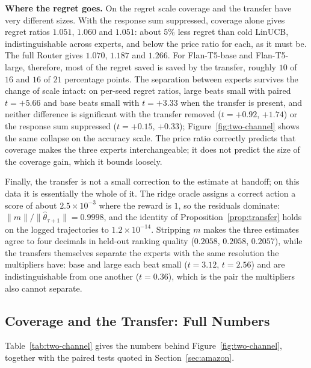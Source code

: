 \documentclass{article}
\theoremstyle{definition}
\theoremstyle{remark}
\theoremstyle{remark}
\begin{document}
\textbf{Where the regret goes.} On the regret scale coverage and the transfer
have very different sizes. With the response sum suppressed, coverage alone gives
regret ratios $1.051$, $1.060$ and $1.051$: about $5\%$ less regret than cold
LinUCB, indistinguishable across experts, and below the price ratio for each,
as it must be. The full Router gives $1.070$, $1.187$ and $1.266$. For
Flan-T5-base and Flan-T5-large, therefore, most of the regret saved is saved
by the transfer, roughly $10$ of $16$ and $16$ of $21$ percentage points. The
separation between experts survives the change of scale intact: on per-seed
regret ratios, large beats small with paired $t=+5.66$ and base beats small
with $t=+3.33$ when the transfer is present, and neither difference is
significant with the transfer removed ($t=+0.92$, $+1.74$) or the response sum
suppressed ($t=+0.15$, $+0.33$); Figure~\ref{fig:two-channel} shows the same
collapse on the accuracy scale. The price ratio correctly predicts that
coverage makes the three experts interchangeable; it does not predict the size
of the coverage gain, which it bounds loosely.

Finally, the transfer is not a small correction to the estimate at handoff; on
this data it is essentially the whole of it. The ridge oracle assigns a
correct action a score of about $2.5\times10^{-3}$ where the reward is $1$, so
the residuals dominate: $\|m\|/\|\widehat\theta_{\tau+1}\|=0.9998$, and the
identity of Proposition~\ref{prop:transfer} holds on the logged trajectories
to $1.2\times10^{-14}$. Stripping $m$ makes the three estimates agree to four
decimals in held-out ranking quality ($0.2058$, $0.2058$, $0.2057$), while the
transfers themselves separate the experts with the same resolution the
multipliers have: base and large each beat small ($t=3.12$, $t=2.56$) and are
indistinguishable from one another ($t=0.36$), which is the pair the
multipliers also cannot separate.

\subsection{Coverage and the Transfer: Full Numbers}
\label{app:two-channel}

Table~\ref{tab:two-channel} gives the numbers behind
Figure~\ref{fig:two-channel}, together with the paired tests quoted in
Section~\ref{sec:amazon}.
\end{document}
